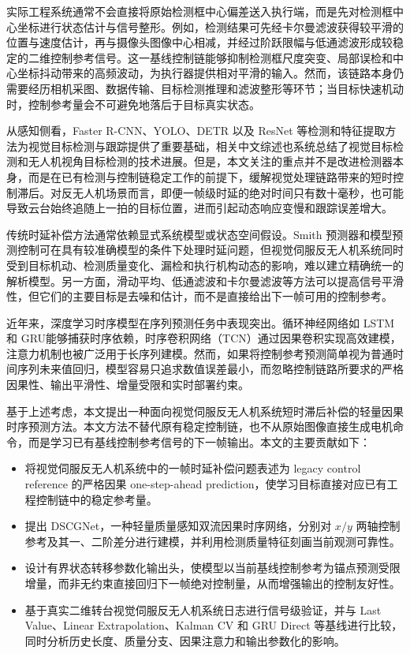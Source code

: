 \documentclass[journal]{IEEEtran}
\begin{document}
实际工程系统通常不会直接将原始检测框中心偏差送入执行端，而是先对检测框中心坐标进行状态估计与信号整形。例如，检测结果可先经卡尔曼滤波获得较平滑的位置与速度估计，再与摄像头图像中心相减，并经过阶跃限幅与低通滤波形成较稳定的二维控制参考信号\cite{yilmaz2006object,kalman1960new,welch1995introduction}。这一基线控制链能够抑制检测框尺度突变、局部误检和中心坐标抖动带来的高频波动，为执行器提供相对平滑的输入。然而，该链路本身仍需要经历相机采图、数据传输、目标检测推理和滤波整形等环节；当目标快速机动时，控制参考量会不可避免地落后于目标真实状态。

从感知侧看，Faster R-CNN、YOLO、DETR 以及 ResNet 等检测和特征提取方法为视觉目标检测与跟踪提供了重要基础\cite{redmon2016you,he2016deep,ren2015faster,bochkovskiy2020yolov4,carion2020detr}，相关中文综述也系统总结了视觉目标检测和无人机视角目标检测的技术进展\cite{cao2022survey_cn,leng2023droneview_cn}。但是，本文关注的重点并不是改进检测器本身，而是在已有检测与控制链稳定工作的前提下，缓解视觉处理链路带来的短时控制滞后。对反无人机场景而言，即便一帧级时延的绝对时间只有数十毫秒，也可能导致云台始终追随上一拍的目标位置，进而引起动态响应变慢和跟踪误差增大。

传统时延补偿方法通常依赖显式系统模型或状态空间假设。Smith 预测器\cite{smith1957closer}和模型预测控制\cite{camacho2013model}可在具有较准确模型的条件下处理时延问题，但视觉伺服反无人机系统同时受到目标机动、检测质量变化、漏检和执行机构动态的影响，难以建立精确统一的解析模型。另一方面，滑动平均、低通滤波和卡尔曼滤波等方法可以提高信号平滑性，但它们的主要目标是去噪和估计，而不是直接给出下一帧可用的控制参考。

近年来，深度学习时序模型在序列预测任务中表现突出\cite{lecun2015deep}。循环神经网络如 LSTM\cite{hochreiter1997long}和 GRU\cite{cho2014learning}能够捕获时序依赖，时序卷积网络（TCN）\cite{bai2018empirical}通过因果卷积实现高效建模，注意力机制也被广泛用于长序列建模\cite{vaswani2017attention,lim2021tft,wen2023transformers}。然而，如果将控制参考预测简单视为普通时间序列未来值回归，模型容易只追求数值误差最小，而忽略控制链路所要求的严格因果性、输出平滑性、增量受限和实时部署约束。

基于上述考虑，本文提出一种面向视觉伺服反无人机系统短时滞后补偿的轻量因果时序预测方法。本文方法不替代原有稳定控制链，也不从原始图像直接生成电机命令，而是学习已有基线控制参考信号的下一帧输出。本文的主要贡献如下：
\begin{itemize}
    \item 将视觉伺服反无人机系统中的一帧时延补偿问题表述为 legacy control reference 的严格因果 one-step-ahead prediction，使学习目标直接对应已有工程控制链中的稳定参考量。
    \item 提出 DSCGNet，一种轻量质量感知双流因果时序网络，分别对 $x/y$ 两轴控制参考及其一、二阶差分进行建模，并利用检测质量特征刻画当前观测可靠性。
    \item 设计有界状态转移参数化输出头，使模型以当前基线控制参考为锚点预测受限增量，而非无约束直接回归下一帧绝对控制量，从而增强输出的控制友好性。
    \item 基于真实二维转台视觉伺服反无人机系统日志进行信号级验证，并与 Last Value、Linear Extrapolation、Kalman CV 和 GRU Direct 等基线进行比较，同时分析历史长度、质量分支、因果注意力和输出参数化的影响。
\end{itemize}
\end{document}
